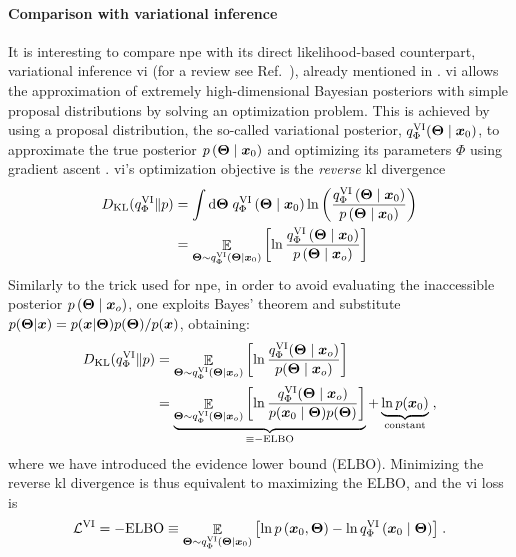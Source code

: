 \paragraph{Comparison with variational inference} 
It is interesting to compare \gls*{npe} with its direct likelihood-based counterpart, variational inference \gls*{vi} (for a review see Ref.~\cite{zhang2018advances}), already mentioned in . \Gls*{vi} allows the approximation of extremely high-dimensional Bayesian posteriors with simple proposal distributions by solving an optimization problem. 
This is achieved by using a proposal distribution, the so-called variational posterior, $q^\text{VI}_\Phi(\bm{\Theta} \mid \bm{x}_0)$, to approximate the true posterior $p\left(\bm{\Theta} \mid \bm{x}_0\right)$ and optimizing its parameters $\Phi$ using gradient ascent \cite{Murphy:book, bottou:nips, kingma2014adam}. \Gls*{vi}'s optimization objective is the \emph{reverse} \gls*{kl} divergence
%
\begin{align} \label{eq:rkl}
	D_{\mathrm{KL}}(q^\text{VI}_\Phi \| p)  &= \int \dd \bm{\Theta}\; q^\text{VI}_\Phi\left(\bm{\Theta} \mid \bm{x}_0 \right) \ln \left(\frac{q^\text{VI}_\Phi\left(\bm{\Theta} \mid \bm{x}_0\right)}{p\left(\bm{\Theta} \mid \bm{x}_0\right)}\right) \\
	& =\mathop{\mathbb{E}}\limits_{\bm{\Theta} \sim q^\text{VI}_\Phi\left(\bm{\Theta} \mid \bm{x}_0\right)}\left[\ln \frac{q^\text{VI}_\Phi\left(\bm{\Theta} \mid \bm{x}_0\right)}{p\left(\bm{\Theta} \mid \bm{x}_o\right)}\right]
\end{align}
%
Similarly to the trick used for \gls*{npe}, in order to avoid evaluating the inaccessible posterior $p\left(\bm{\Theta} \mid \bm{x}_o\right)$, one exploits Bayes' theorem and substitute $p(\bm{\Theta}| \bm{x}) = p(\bm{x}| \bm{\Theta}) p(\bm{\Theta}) / p(\bm{x})$, obtaining:
%
\begin{align}
	D_{\mathrm{KL}}(q^\text{VI}_\Phi \| p) &=
	\mathop{\mathbb{E}}\limits_{\bm{\Theta} \sim q^\text{VI}_\Phi(\bm{\Theta} \mid \bm{x}_o)}\left[\ln \frac{q^\text{VI}_\Phi(\bm{\Theta} \mid \bm{x}_o)}{p(\bm{\Theta} \mid \bm{x}_o)}\right] \\
	& =\underbrace{\mathop{\mathbb{E}}\limits_{\bm{\Theta} \sim q^\text{VI}_\Phi(\bm{\Theta}\mid \bm{x}_o)}\left[\ln \frac{q^\text{VI}_\Phi(\bm{\Theta} \mid \bm{x}_o)}{p(\bm{x}_0 \mid \bm{\Theta}) p(\bm{\Theta})}\right]}_{\equiv-{\rm ELBO}}+ \underbrace{\ln p(\bm{x}_0)}_\text{constant} \;,
\end{align}
%
where we have introduced the evidence lower bound (ELBO). Minimizing the reverse \gls*{kl} divergence is thus equivalent to maximizing the ELBO, and the \gls*{vi} loss is
%
\begin{equation} \label{eq:lvi}
	\mathcal{L}^\text{VI} = -\mathrm{ELBO} \equiv {\mathop{\mathbb{E}}\limits_{\ensuremath{\bm{\Theta}}\sim q^\text{VI}_\Phi\left(\ensuremath{\bm{\Theta}}\mid \ensuremath{\bm{x}}_0\right)}\left[\ln p\left(\ensuremath{\bm{x}}_0, \ensuremath{\bm{\Theta}}\right)-\ln q^\text{VI}_\Phi\left(\ensuremath{\bm{x}}_0 \mid \ensuremath{\bm{\Theta}}\right)\right]} \;.
\end{equation}


